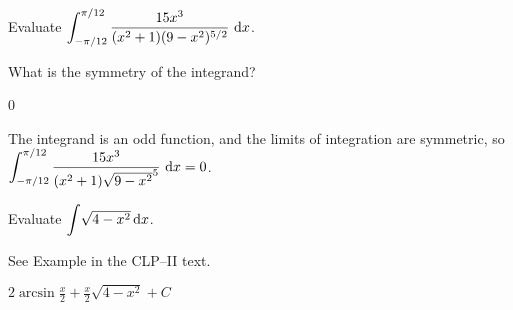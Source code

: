 \begin{question}
Evaluate $\displaystyle\int_{-\pi/12}^{\pi/12} \dfrac{15x^3}{(x^2+1)(9-x^2)^{5/2}}~\mathrm{d}x$.
\end{question}
\begin{hint}
What is the symmetry of the integrand?
\end{hint}
\begin{answer}
0
\end{answer}
\begin{solution}
The integrand is an odd function, and the limits of integration are symmetric, so
$\displaystyle\int_{-\pi/12}^{\pi/12} \dfrac{15x^3}{(x^2+1)\sqrt{9-x^2}^5}~\mathrm{d}x=0$.
\end{solution}




\begin{question}[M121 2014A]
Evaluate ${\displaystyle\int} \sqrt{4-x^2}\,\mathrm{d}x$.
\end{question}

\begin{hint}
See Example  in the
CLP--II text.
\end{hint}

\begin{answer}
$\displaystyle2\arcsin\frac{x}{2}+\frac{x}{2}\sqrt{4-x^2}+ C$
\end{answer}

